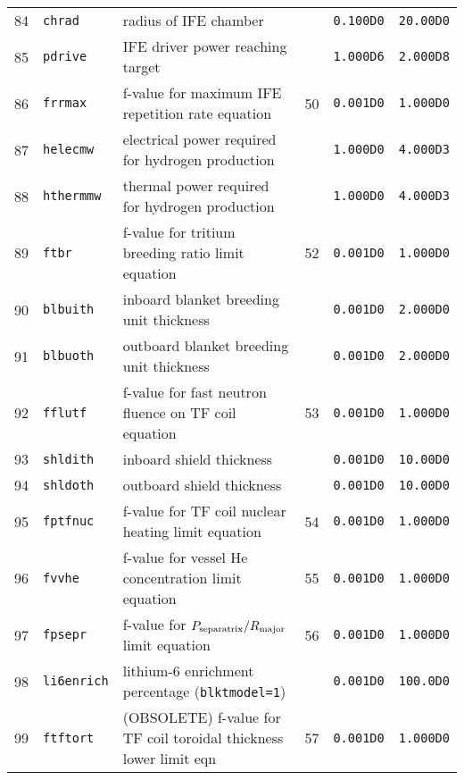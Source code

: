 \documentclass[11pt,a4paper]{report}
\begin{document}
\begin{table}[tbph]
\begin{center}
\begin{tabular}{||c|l|l|c|c|c||}
84  & \texttt{chrad}    & radius of IFE chamber                                   &     & \texttt{0.100D0} & \texttt{20.00D0} \\
85  & \texttt{pdrive}   & IFE driver power reaching target                        &     & \texttt{1.000D6} & \texttt{2.000D8} \\
86  & \texttt{frrmax}   & f-value for maximum IFE repetition rate equation        & 50  & \texttt{0.001D0} & \texttt{1.000D0} \\
87  & \texttt{helecmw}  & electrical power required for hydrogen production       &     & \texttt{1.000D0} & \texttt{4.000D3} \\
88  & \texttt{hthermmw} & thermal power required for hydrogen production          &     & \texttt{1.000D0} & \texttt{4.000D3} \\
89  & \texttt{ftbr}     & f-value for tritium breeding ratio limit equation       & 52  & \texttt{0.001D0} & \texttt{1.000D0} \\
90  & \texttt{blbuith}  & inboard blanket breeding unit thickness                 &     & \texttt{0.001D0} & \texttt{2.000D0} \\
91  & \texttt{blbuoth}  & outboard blanket breeding unit thickness                &     & \texttt{0.001D0} & \texttt{2.000D0} \\
92  & \texttt{fflutf}   & f-value for fast neutron fluence on TF coil equation    & 53  & \texttt{0.001D0} & \texttt{1.000D0} \\
93  & \texttt{shldith}  & inboard shield thickness                                &     & \texttt{0.001D0} & \texttt{10.00D0} \\
94  & \texttt{shldoth}  & outboard shield thickness                               &     & \texttt{0.001D0} & \texttt{10.00D0} \\
95  & \texttt{fptfnuc}  & f-value for TF coil nuclear heating limit equation      & 54  & \texttt{0.001D0} & \texttt{1.000D0} \\
96  & \texttt{fvvhe}    & f-value for vessel He concentration limit equation      & 55  & \texttt{0.001D0} & \texttt{1.000D0} \\
97  & \texttt{fpsepr}   & f-value for $P_{\mbox{\scriptsize separatrix}}/R_{\mbox{\scriptsize major}}$ limit equation & 56
  & \texttt{0.001D0} & \texttt{1.000D0} \\
98  & \texttt{li6enrich}& lithium-6 enrichment percentage (\texttt{blktmodel=1})  &     & \texttt{0.001D0} & \texttt{100.0D0} \\
99  & \texttt{ftftort}  & (OBSOLETE) f-value for TF coil toroidal thickness lower limit eqn  & 57  & \texttt{0.001D0} & \texttt{1.000D0} \\

\end{tabular}
\end{center}
\end{table}
\end{document}
